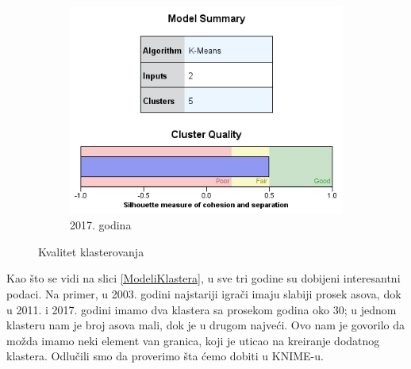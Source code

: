 \documentclass[a4paper]{article}
\begin{document}
\begin{figure}[H]
	\vspace{1cm}
	\begin{subfigure}[h]{\textwidth}
		\begin{center}
			\includegraphics[scale=0.50]{Klasterovanje/Model_KMeans2017_Silhouette.png}
		\end{center}
		\caption{2017. godina}
		\label{fig:SPSS_Silueta2017}
	\end{subfigure}
	
	\caption{Kvalitet klasterovanja}
	\label{Siluete}
\end{figure}

Kao što se vidi na slici \ref{ModeliKlastera}, u sve tri godine su dobijeni interesantni podaci. Na primer, u 2003. godini najstariji igrači imaju slabiji prosek asova, dok u 2011. i 2017. godini imamo dva klastera sa prosekom godina oko 30; u jednom klasteru nam je broj asova mali, dok je u drugom najveći. Ovo nam je govorilo da možda imamo neki element van granica, koji je uticao na kreiranje dodatnog klastera. Odlučili smo da proverimo šta ćemo dobiti u KNIME-u.
\end{document}

